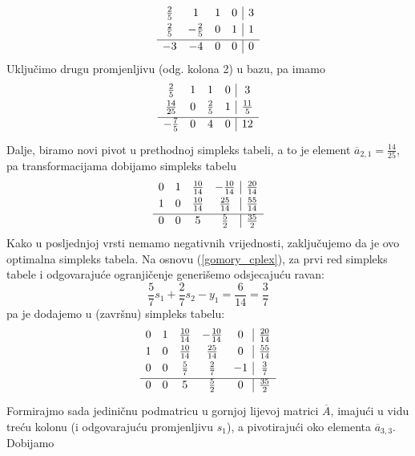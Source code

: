 \documentclass[b5paper, utf8, 11pt, colorlinks]{book}
\theoremstyle{definition}
\begin{document}
$$\begin{array}{cccc|c}\vspace{1mm}
   \frac{2}{5}           & 1               & 1 & 0 & 3 \\\vspace{1mm}
   \frac{2}{5}           & -\frac{2}{5}    & 0 & 1 & 1 \\ \hline
   -3                    &  -4             & 0 & 0 & 0
\end{array}$$
Uključimo drugu promjenljivu (odg. kolona 2) u bazu, pa imamo 
$$\begin{array}{cccc|c}\vspace{1mm}
   \frac{2}{5}           & 1               & 1           & 0 & 3 \\\vspace{1mm}
   \frac{14}{25}         & 0    & \frac{2}{5} & 1&\frac{11}{5}\\\hline\vspace{1mm}
   -\frac{7}{5}     & 0     &4 & 0 & 12
\end{array}$$
Dalje, biramo novi pivot  u prethodnoj simpleks tabeli, a to je element $\overline{a}_{2,1} = \frac{14}{25}$, pa transformacijama dobijamo simpleks tabelu
$$
\begin{array}{cccc|c}\vspace{1mm}
    0    &  1  &  \frac{10}{14} &  -\frac{10}{14}  &  \frac{20}{14}  \\\vspace{1mm}
    1    &  0  &  \frac{10}{14} &   \frac{25}{14}  &   \frac{55}{14}\\ \hline
    0    &  0  &  5             &    \frac{5}{2}   &    \frac{35}{2}
\end{array}
$$
Kako u posljednjoj vrsti nemamo negativnih vrijednosti, zaključujemo da je ovo optimalna simpleks tabela. Na osnovu (\ref{gomory_cplex}),   za prvi red simpleks tabele i odgovarajuće ogranjičenje generišemo odsjecajuću ravan:
$$   \frac{5}{7}s_1 + \frac{2}{7} s_2 -      y_1   = \frac{6}{14}=\frac{3}{7}$$
pa je dodajemo u (završnu) simpleks tabelu:
$$
\begin{array}{ccccc|c}\vspace{1mm}
    0    &  1  &  \frac{10}{14} &  -\frac{10}{14}  &  0 & \frac{20}{14} \\\vspace{1mm}
    1    &  0  &  \frac{10}{14} &   \frac{25}{14}  &  0 & \frac{55}{14}\\ \vspace{1mm}
    0    &  0  & \frac{5}{7}    &   \frac{2}{7}    &  -1 & \frac{3}{7}  \\\hline \vspace{1mm}
    0    &  0  &  5             &    \frac{5}{2}   &  0 &    \frac{35}{2}
\end{array}
$$
Formirajmo sada jediničnu podmatricu u gornjoj lijevoj matrici $\overline{A}$, imajući u vidu treću kolonu (i odgovarajuću promjenljivu $s_1$), a pivotirajući oko elementa $\overline{a}_{3,3}$. Dobijamo 
\end{document}
